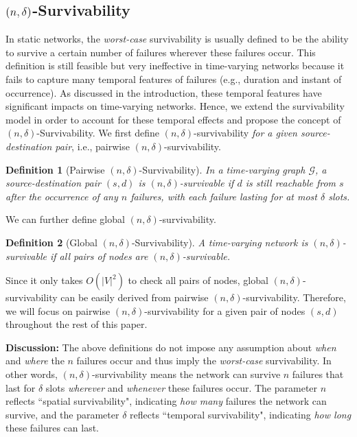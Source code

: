 \documentclass[10pt, conference, letterpaper]{IEEEtran}
\newtheorem{definition}{Definition}
\begin{document}
\subsection{$\mathlarger{\mathlarger{(n,\delta)}}$-Survivability}
In static networks, the \emph{worst-case} survivability is usually defined to be the ability to survive a certain number of failures wherever these failures occur. This definition is still feasible but very ineffective in time-varying networks because it fails to capture many temporal features of failures (e.g., duration and instant of occurrence). As discussed in the introduction, these temporal features  have significant impacts on time-varying networks. Hence, we extend the survivability model in order to account for these temporal effects and propose the concept of ${(n,\delta)}$-Survivability.
We first define $(n,\delta)$-survivability \emph{for a given source-destination pair}, i.e., pairwise $(n,\delta)$-survivability.

\begin{definition}[{Pairwise ${(n,\delta)}$-Survivability}]\label{local_def}
In a time-varying graph $\mathcal{G}$, a source-destination pair $(s,d)$ is $(n,\delta)$-survivable if $d$ is still reachable from $s$ after the occurrence of any $n$ failures, with each failure lasting for at most $\delta$ slots.
\end{definition}

\noindent We can further define global $(n,\delta)$-survivability.

\begin{definition}[{Global ${(n,\delta)}$-Survivability}] A time-varying network is $(n,\delta)$-survivable if all pairs of nodes are $(n,\delta)$-survivable.
\end{definition}

\noindent Since it only takes $O(|V|^2)$ to check all pairs of nodes, global $(n,\delta)$-survivability can be easily derived from pairwise $(n,\delta)$-survivability. Therefore, we will focus on pairwise $(n,\delta)$-survivability for a given pair of nodes $(s,d)$ throughout the rest of this paper.

\vspace{1mm}

\noindent \textbf{Discussion:} The above definitions do not impose any assumption about \emph{when} and \emph{where} the $n$ failures occur and thus imply the \emph{worst-case} survivability. In other words, $(n,\delta)$-survivability means the network can survive $n$ failures that last for $\delta$ slots \emph{wherever} and \emph{whenever} these failures occur. The parameter $n$ reflects ``spatial survivability", indicating \emph{how many} failures the network can survive, and the parameter $\delta$ reflects ``temporal survivability", indicating \emph{how long} these failures can last.
\end{document}
